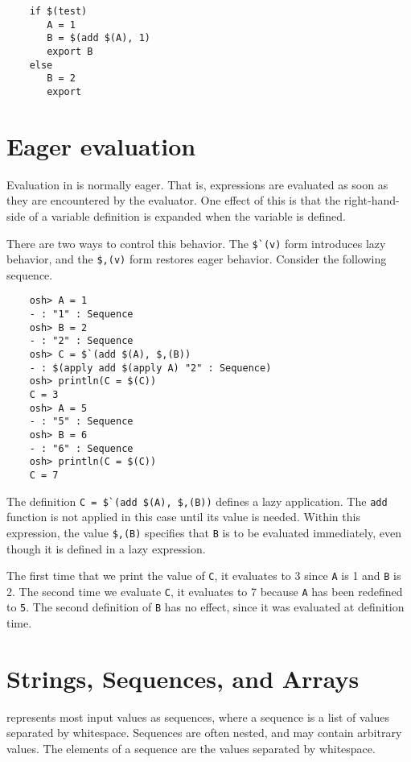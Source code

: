 \begin{verbatim}
    if $(test)
       A = 1
       B = $(add $(A), 1)
       export B
    else
       B = 2
       export
\end{verbatim}

\section{Eager evaluation}

Evaluation in  is normally eager.  That is, expressions
are evaluated as soon as they are encountered by the evaluator.  One effect
of this is that the right-hand-side of a variable definition is expanded
when the variable is defined.

There are two ways to control this behavior.  The \verb+$`(v)+ form
introduces lazy behavior, and the \verb+$,(v)+ form restores
eager behavior.  Consider the following sequence.

\begin{verbatim}
    osh> A = 1
    - : "1" : Sequence
    osh> B = 2
    - : "2" : Sequence
    osh> C = $`(add $(A), $,(B))
    - : $(apply add $(apply A) "2" : Sequence)
    osh> println(C = $(C))
    C = 3
    osh> A = 5
    - : "5" : Sequence
    osh> B = 6
    - : "6" : Sequence
    osh> println(C = $(C))
    C = 7
\end{verbatim}

The definition \verb+C = $`(add $(A), $,(B))+ defines a lazy application.
The \verb+add+ function is not applied in this case until its value is needed.
Within this expression, the value \verb+$,(B)+ specifies that \verb+B+ is
to be evaluated immediately, even though it is defined in a lazy expression.

The first time that we print the value of \verb+C+, it evaluates to 3
since \verb+A+ is 1 and \verb+B+ is 2.  The second time we evaluate \verb+C+,
it evaluates to 7 because \verb+A+ has been redefined to \verb+5+.  The second
definition of \verb+B+ has no effect, since it was evaluated at definition time.

\section{Strings, Sequences, and Arrays}

 represents most input values as sequences, where a sequence is a list
of values separated by whitespace.  Sequences are often nested, and may contain
arbitrary values.  The elements of a sequence are the values separated by whitespace.

